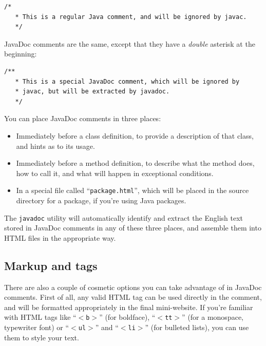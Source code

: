 \vspace{-.11in}
\begin{Verbatim}[fontsize=\footnotesize,samepage=true,frame=none]
  /*
   * This is a regular Java comment, and will be ignored by javac.
   */
\end{Verbatim}
\vspace{-.11in}

JavaDoc comments are the same, except that they have a \textit{double}
asterisk at the beginning:

\vspace{-.11in}
\begin{Verbatim}[fontsize=\footnotesize,samepage=true,frame=none]
  /**
   * This is a special JavaDoc comment, which will be ignored by
   * javac, but will be extracted by javadoc.
   */
\end{Verbatim}
\vspace{-.11in}

You can place JavaDoc comments in three places:

\begin{itemize}
\itemsep.1em

\item Immediately before a class definition, to provide a description of that
class, and hints as to its usage.

\item Immediately before a method definition, to describe what the method
does, how to call it, and what will happen in exceptional conditions.

\item In a special file called ``\texttt{package.html}'', which will be placed
in the source directory for a package, if you're using Java packages.

\end{itemize}

The \texttt{javadoc} utility will automatically identify and extract the
English text stored in JavaDoc comments in any of these three places, and
assemble them into HTML files in the appropriate way.

\subsection{Markup and tags}

There are also a couple of cosmetic options you can take advantage of in
JavaDoc comments. First of all, any valid HTML tag can be used directly in the
comment, and will be formatted appropriately in the final mini-website. If
you're familiar with HTML tags like ``\texttt{$<$b$>$}'' (for boldface),
``\texttt{$<$tt$>$}'' (for a monospace, typewriter font) or
``\texttt{$<$ul$>$}'' and ``\texttt{$<$li$>$}'' (for bulleted lists), you can
use them to style your text.

